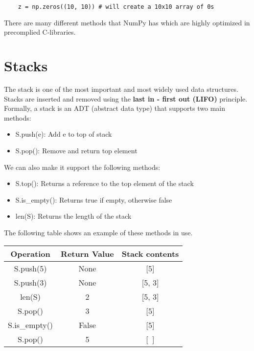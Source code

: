 \documentclass[]{article}
\begin{document}
\begin{lstlisting}
	z = np.zeros((10, 10)) # will create a 10x10 array of 0s
\end{lstlisting}

There are many different methods that NumPy has which are highly optimized in precomplied C-libraries.


\section{Stacks}\bigbreak\bigbreak

The stack is one of the most important and most widely used data structures. Stacks are inserted and removed using the \textbf{last in - first out (LIFO)} principle. \\

Formally, a stack is an ADT (abstract data type) that supports two main methods:

\begin{itemize}
	\item S.push(e): Add e to top of stack
	\item S.pop(): Remove and return top element
\end{itemize}

We can also make it support the following methods:

\begin{itemize}
	\item S.top(): Returns a reference to the top element of the stack
	\item S.is\_empty(): Returns true if empty, otherwise false
	\item len(S): Returns the length of the stack
\end{itemize}

The following table shows an example of these methods in use.

\begin{center}
	\begin{table}[h!]\centering
		\begin{tabular}{|c|c|c|}
			\hline
			Operation   &Return Value   &Stack contents\\\hline
			S.push(5) & None & [5]\\
			S.push(3) & None & [5, 3]\\
			len(S) & 2 & [5, 3]\\
			S.pop() & 3 & [5]\\
			S.is\_empty() & False & [5]\\
			S.pop() & 5 & [~]\\\hline
		\end{tabular}
	\end{table}
\end{center}
\end{document}
